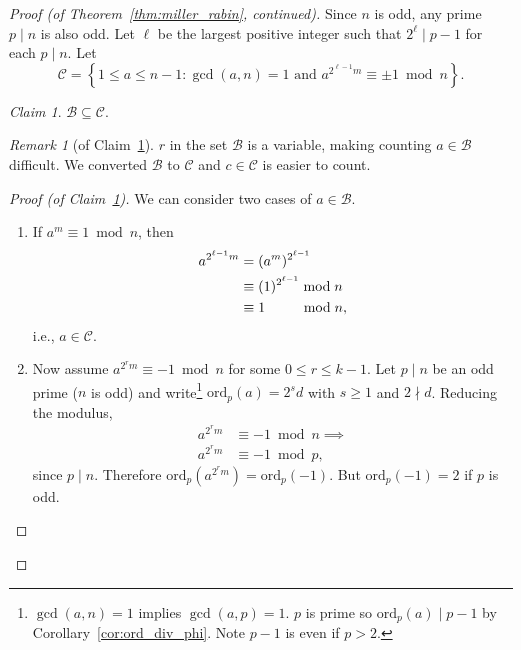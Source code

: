 \documentclass{amsbook}
\theoremstyle{plain}
\theoremstyle{definition}
\theoremstyle{remark}
\newtheorem{remark}[theorem]{Remark}
\newtheorem{claim}[theorem]{Claim}
\numberwithin{equation}{chapter}
\numberwithin{figure}{chapter}
\newcommand{\sB}{\mathcal{B}}
\newcommand{\sC}{\mathcal{C}}
\newcommand*{\ord}{\text{ord}}
\begin{document}
\begin{proof}[Proof {\rm (of Theorem~\ref{thm:miller_rabin}, continued)}]\renewcommand*{\qedsymbol}{}
Since $n$ is odd, any prime $p \mid n$ is also odd. Let $\ell$ be the largest positive integer such that $2^\ell \mid p - 1$ for each $p \mid n$. Let 
\[
\sC = \left\{ 1 \leqslant a \leqslant n - 1 : \gcd (a, n) = 1 \text{ and } a^{2^{\ell - 1}m} \equiv \pm 1 \bmod n \right\}.
\]
\begin{claim}\label{clm:clm1_day35}
  $\sB \subseteq \sC$.
\end{claim}
\begin{remark}[of Claim~\ref{clm:clm1_day35}]
  $r$ in the set $\sB$ is a variable, making counting $a \in \sB$ difficult. We converted $\sB$ to $\sC$ and $c \in \sC$ is easier to count.
\end{remark}
\begin{proof}[Proof {\rm (of Claim~\ref{clm:clm1_day35})}]\renewcommand*{\qedsymbol}{\ensuremath{\square}}
  We can consider two cases of $a \in \sB$. %
  \begin{enumerate}[label=(\roman*)]  
  \item If $a^m \equiv 1 \bmod n$, then 
    \begin{align}
      a^{2^{\ell - 1}m} &= (a^m)^{2^{\ell - 1}} \\
                        &\equiv (1)^{2^{\ell - 1}} \bmod n\\
                        &\equiv 1 \hspace{8.7mm}\bmod n,
    \end{align}
    i.e., $a \in \sC$.
  \item Now assume $a^{2^r m} \equiv -1 \bmod n$ for some $0 \leqslant r \leqslant k - 1$. Let $p \mid n$ be an odd prime ($n$ is odd) and write\footnote{$\gcd (a, n) = 1$ implies $\gcd (a, p) = 1$. $p$ is prime so $\ord_p (a) \mid p - 1$ by Corollary~\ref{cor:ord_div_phi}. Note $p - 1$ is even if $p > 2$.} $\ord_p (a) = 2^s d$ with $s \geqslant 1$ and $2 \nmid d$. Reducing the modulus,
    \begin{align}
      a^{2^r m} &\equiv -1 \bmod n \implies \\
      a^{2^r m} &\equiv -1 \bmod p,
    \end{align}
    since $p \mid n$. Therefore $\ord_p (a^{2^r m}) = \ord_p (-1)$. But $\ord_p (-1) = 2$ if $p$ is odd.


\end{enumerate}
\end{proof}
\end{proof}
\end{document}

